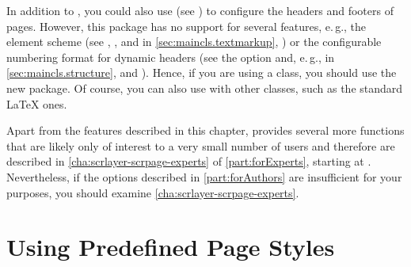 In addition to ,
you could also use  (see
\cite{package:fancyhdr}) to configure the headers and footers of pages.
However, this package has no support for several \KOMAScript{} features,
e.\,g., the element scheme (see ,
, and
 in \autoref{sec:maincls.textmarkup},
) or the configurable numbering format
for dynamic headers (see the  option and,
e.\,g.,  in
\autoref{sec:maincls.structure},  and
). Hence, if you are using a
\KOMAScript{} class, you should use the new 
package.  Of course, you can also use
 with other classes, such as the standard \LaTeX{}
ones.

Apart from the features described in this chapter, 
provides several more functions that are likely only of interest to a very
small number of users and therefore are described in
\autoref{cha:scrlayer-scrpage-experts} of \autoref{part:forExperts}, starting
at . Nevertheless, if the options
described in \autoref{part:forAuthors} are insufficient for your purposes, you
should examine \autoref{cha:scrlayer-scrpage-experts}.




\section{Using Predefined Page Styles}

